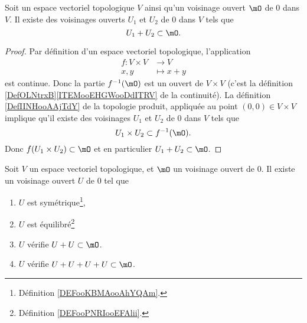 \begin{lemma}     \label{LEMooQEFRooHAxOys}
	Soit un espace vectoriel topologique \( V\) ainsi qu'un voisinage ouvert \( \mO\) de \( 0\) dans \( V\). Il existe des voisinages ouverts \( U_1\) et \( U_2\) de \( 0\) dans \( V\) tels que
	\begin{equation}
		U_1+U_2\subset \mO.
	\end{equation}
\end{lemma}

\begin{proof}
	Par définition d'un espace vectoriel topologique, l'application
	\begin{equation}
		\begin{aligned}
			f\colon V\times V & \to V       \\
			x,y               & \mapsto x+y
		\end{aligned}
	\end{equation}
	est continue. Donc la partie \( f^{-1}(\mO)\) est un ouvert de \( V\times V\) (c'est la définition \ref{DefOLNtrxB}\ref{ITEMooEHGWooDdITRV} de la continuité). La définition \ref{DefIINHooAAjTdY} de la topologie produit, appliquée au point \( (0,0)\in V\times V\) implique qu'il existe des voisinages \( U_1\) et \( U_2\) de \( 0\) dans \( V\) tels que
	\begin{equation}
		U_1\times U_2\subset f^{-1}(\mO).
	\end{equation}
	Donc \( f(U_1\times U_2)\subset\mO\) et en particulier \( U_1+U_2\subset \mO\).
\end{proof}

\begin{proposition}\label{PROPSommeTopologique}
	Soit \( V \) un espace vectoriel topologique, et \( \mO \) un voisinage ouvert de \( 0 \). Il existe un voisinage ouvert \( U\) de \( 0 \) tel que
	\begin{enumerate}
		\item
		      \( U\) est symétrique\footnote{Définition \ref{DEFooKBMAooAhYQAm}.},
		\item
		      \( U\) est équilibré\footnote{Définition \ref{DEFooPNRIooEFAlii}.}
		\item
		      \( U\) vérifie \( U + U \subset \mO \).
		\item
		      \( U\) vérifie \( U + U + U + U \subset \mO \).
	\end{enumerate}
\end{proposition}

